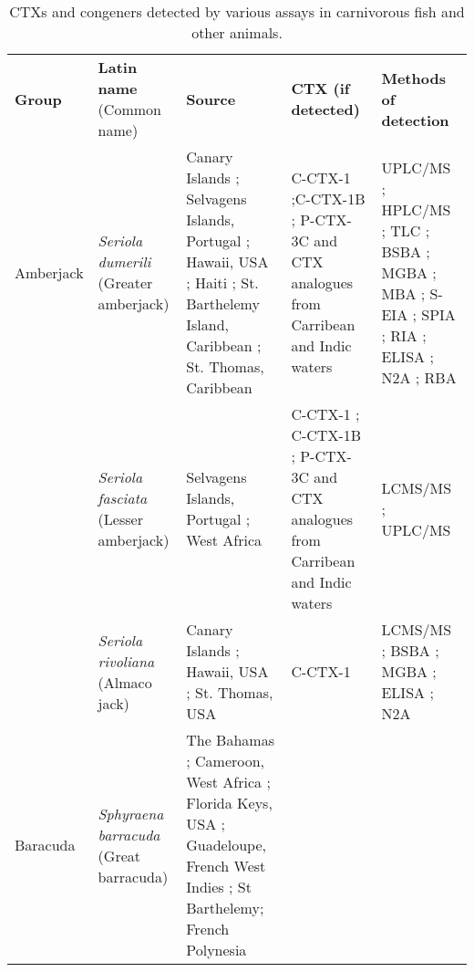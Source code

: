 \documentclass[12pt]{article}
\begin{document}
\FloatBarrier
\begin{longtable}{  p{2cm} p{3cm}  p{4.5cm}  p{2cm}  p{3cm}  }
\caption{CTXs and congeners detected by various assays in carnivorous fish and other animals.}\\
\label{tbl:CarnTable}
\textbf{Group} & \textbf{Latin name} (Common name) & \textbf{Source} & \textbf{CTX (if detected)} & \textbf{Methods of detection} \\
Amberjack &  \emph{Seriola dumerili} (Greater amberjack) & Canary Islands \cite{caillaud2012towards}; Selvagens Islands, Portugal \cite{otero2010first}; Hawaii, USA \cite{campora2008detection,hokama1977radioimmunoassay,hokama1983rapid,hokama1985rapid}; Haiti \cite{poli1997identification}; St. Barthelemy Island, Caribbean \cite{vernoux1986heterogeneity}; St. Thomas, Caribbean \cite{granade1976ciguatera} & C-CTX-1 \cite{poli1997identification};C-CTX-1B \cite{otero2010first}; P-CTX-3C and CTX analogues from Carribean and Indic waters \cite{otero2010first} & UPLC/MS \cite{otero2010first}; HPLC/MS \cite{poli1997identification}; TLC \cite{vernoux1986heterogeneity}; BSBA \cite{granade1976ciguatera}; MGBA \cite{campora2008detection,granade1976ciguatera}; MBA \cite{hokama1983rapid,hokama1985rapid,vernoux1986heterogeneity}; S-EIA \cite{hokama1985rapid}; SPIA \cite{otero2010first}; RIA \cite{campora2008detection,hokama1983rapid}; ELISA \cite{campora2008detection}; N2A \cite{caillaud2012towards,campora2008detection}; RBA \cite{} \\
  & \emph{Seriola fasciata} (Lesser amberjack) & Selvagens Islands, Portugal \cite{otero2010first}; West Africa \cite{boada2010ciguatera} & C-CTX-1 \cite{boada2010ciguatera}; C-CTX-1B \cite{otero2010first}; P-CTX-3C and CTX analogues from Carribean and Indic waters \cite{otero2010first} & LCMS/MS \cite{boada2010ciguatera}; UPLC/MS \cite{otero2010first}\\
 & \emph{Seriola rivoliana} (Almaco jack) & Canary Islands \cite{campora2010evaluating}; Hawaii, USA \cite{campora2008detection}; St. Thomas, USA \cite{granade1976ciguatera} & C-CTX-1 \cite{} & LCMS/MS \cite{}; BSBA \cite{granade1976ciguatera}; MGBA \cite{granade1976ciguatera}; ELISA \cite{campora2008detection,campora2010evaluating}; N2A \cite{campora2008detection,campora2010evaluating} \\
Baracuda & \emph{Sphyraena barracuda} (Great barracuda) & The Bahamas \cite{}; Cameroon, West Africa \cite{}; Florida Keys, USA \cite{}; Guadeloupe, French West Indies \cite{}; St Barthelemy\cite{}; French Polynesia \cite{} &  & \\

\end{longtable}
\end{document}

